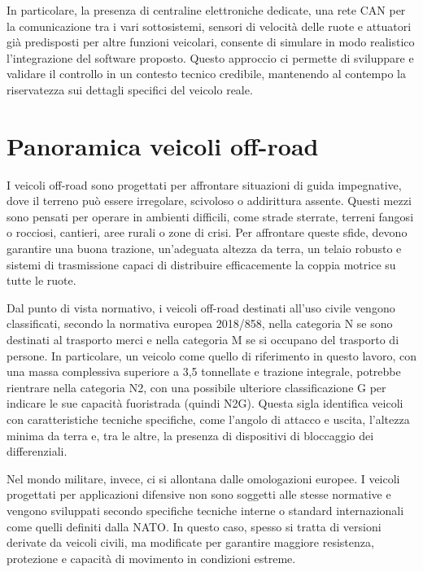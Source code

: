 \documentclass[11pt]{report}
\begin{document}
	In particolare, la presenza di centraline elettroniche dedicate, una rete CAN per la comunicazione tra i vari sottosistemi, sensori di velocità delle ruote e attuatori già predisposti per altre funzioni veicolari, consente di simulare in modo realistico l’integrazione del software proposto. Questo approccio ci permette di sviluppare e validare il controllo in un contesto tecnico credibile, mantenendo al contempo la riservatezza sui dettagli specifici del veicolo reale.
	
	\section{Panoramica veicoli off-road }
	
	I veicoli off-road sono progettati per affrontare situazioni di guida impegnative, dove il terreno può essere irregolare, scivoloso o addirittura assente. Questi mezzi sono pensati per operare in ambienti difficili, come strade sterrate, terreni fangosi o rocciosi, cantieri, aree rurali o zone di crisi. Per affrontare queste sfide, devono garantire una buona trazione, un’adeguata altezza da terra, un telaio robusto e sistemi di trasmissione capaci di distribuire efficacemente la coppia motrice su tutte le ruote.
	
	Dal punto di vista normativo, i veicoli off-road destinati all'uso civile vengono classificati, secondo la normativa europea 2018/858, nella categoria N se sono destinati al trasporto merci e nella categoria M se si occupano del trasporto di persone. In particolare, un veicolo come quello di riferimento in questo lavoro, con una massa complessiva superiore a 3,5 tonnellate e trazione integrale, potrebbe rientrare nella categoria N2, con una possibile ulteriore classificazione G per indicare le sue capacità fuoristrada (quindi N2G). Questa sigla identifica veicoli con caratteristiche tecniche specifiche, come l’angolo di attacco e uscita, l’altezza minima da terra e, tra le altre, la presenza di dispositivi di bloccaggio dei differenziali.\cite{REGOLAMENTO(UE)2018/858}
	
	Nel mondo militare, invece, ci si allontana dalle omologazioni europee. I veicoli progettati per applicazioni difensive non sono soggetti alle stesse normative e vengono sviluppati secondo specifiche tecniche interne o standard internazionali come quelli definiti dalla NATO. In questo caso, spesso si tratta di versioni derivate da veicoli civili, ma modificate per garantire maggiore resistenza, protezione e capacità di movimento in condizioni estreme.
	
\end{document}
